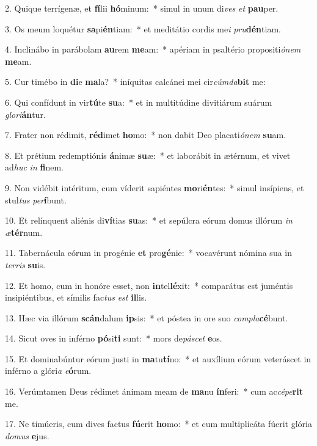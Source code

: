 2. Quique terrígenæ, et \textbf{fí}lii \textbf{hó}minum:~*  simul in unum di\textit{ves} \textit{et} \textbf{pau}per.\

3. Os meum loquétur \textbf{sa}pi\textbf{én}tiam:~*  et meditátio cordis me\textit{i} \textit{pru}\textbf{dén}tiam.\

4. Inclinábo in parábolam \textbf{au}rem \textbf{me}am:~*  apériam in psaltério propositi\textit{ó}\textit{nem} \textbf{me}am.\

5. Cur timébo in \textbf{di}e \textbf{ma}la?~*  iníquitas calcánei mei cir\textit{cúm}\textit{da}\textbf{bit} me:\

6. Qui confídunt in vir\textbf{tú}te \textbf{su}a:~*  et in multitúdine divitiárum suárum \textit{glo}\textit{ri}\textbf{án}tur.\

7. Frater non rédimit, \textbf{réd}imet \textbf{ho}mo:~*  non dabit Deo placati\textit{ó}\textit{nem} \textbf{su}am.\

8. Et prétium redemptiónis \textbf{á}nimæ \textbf{su}æ:~*  et laborábit in ætérnum, et vivet ad\textit{huc} \textit{in} \textbf{fi}nem.\

9. Non vidébit intéritum, cum víderit sapiéntes \textbf{mo}ri\textbf{én}tes:~*  simul insípiens, et stul\textit{tus} \textit{per}\textbf{í}bunt.\

10. Et relínquent aliénis di\textbf{ví}tias \textbf{su}as:~*  et sepúlcra eórum domus illórum \textit{in} \textit{æ}\textbf{tér}num.\

11. Tabernácula eórum in progénie \textbf{et} pro\textbf{gé}nie:~*  vocavérunt nómina sua in \textit{ter}\textit{ris} \textbf{su}is.\

12. Et homo, cum in honóre esset, non \textbf{in}tel\textbf{lé}xit:~*  comparátus est juméntis insipiéntibus, et símilis fac\textit{tus} \textit{est} \textbf{il}lis.\

13. Hæc via illórum \textbf{scán}dalum \textbf{ip}sis:~*  et póstea in ore suo \textit{com}\textit{pla}\textbf{cé}bunt.\

14. Sicut oves in inférno \textbf{pó}si\textbf{ti} sunt:~*  mors de\textit{pá}\textit{scet} \textbf{e}os.\

15. Et dominabúntur eórum justi in \textbf{ma}tu\textbf{tí}no:~*  et auxílium eórum veteráscet in inférno a glóri\textit{a} \textit{e}\textbf{ó}rum.\

16. Verúmtamen Deus rédimet ánimam meam de \textbf{ma}nu \textbf{ín}feri:~*  cum ac\textit{cé}\textit{pe}\textbf{rit} me.\

17. Ne timúeris, cum dives factus \textbf{fú}erit \textbf{ho}mo:~*  et cum multiplicáta fúerit glória \textit{do}\textit{mus} \textbf{e}jus.\

